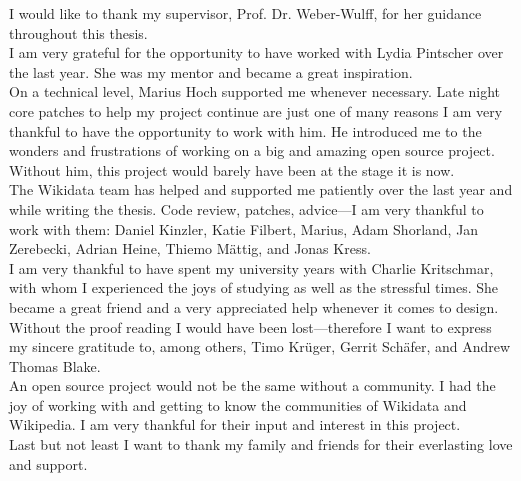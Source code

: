 I would like to thank my supervisor, Prof. Dr. Weber-Wulff, for her guidance throughout this thesis. \\

I am very grateful for the opportunity to have worked with Lydia Pintscher over the last year. She was my mentor and became a great inspiration. \\

On a technical level, Marius Hoch supported me whenever necessary. Late night core patches to help my project continue are just one of many reasons I am very thankful to have the opportunity to work with him. He introduced me to the wonders and frustrations of working on a big and amazing open source project. Without him, this project would barely have been at the stage it is now. \\

The Wikidata team has helped and supported me patiently over the last year and while writing the thesis. Code review, patches, advice---I am very thankful to work with them: Daniel Kinzler, Katie Filbert, Marius, Adam Shorland, Jan Zerebecki, Adrian Heine, Thiemo Mättig, and Jonas Kress.  \\

I am very thankful to have spent my university years with Charlie Kritschmar, with whom I experienced the joys of studying as well as the stressful times. She became a great friend and a very appreciated help whenever it comes to design. \\ 

Without the proof reading I would have been lost---therefore I want to express my sincere gratitude to, among others, Timo Krüger, Gerrit Schäfer, and Andrew Thomas Blake. \\

An open source project would not be the same without a community. I had the joy of working with and getting to know the communities of Wikidata and Wikipedia. I am very thankful for their input and interest in this project. \\

Last but not least I want to thank my family and friends for their everlasting love and support.
